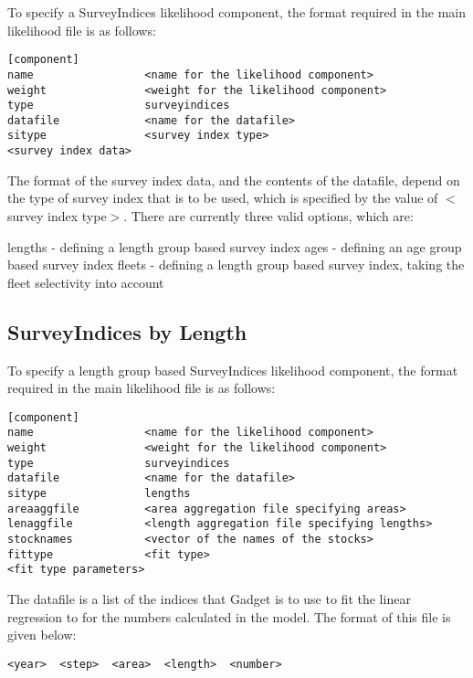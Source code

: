 \documentclass[10pt,twoside]{book}
\begin{document}
\bigskip
To specify a SurveyIndices likelihood component, the format required in the main likelihood file is as follows:

{\small\begin{verbatim}
[component]
name                 <name for the likelihood component>
weight               <weight for the likelihood component>
type                 surveyindices
datafile             <name for the datafile>
sitype               <survey index type>
<survey index data>
\end{verbatim}}

The format of the survey index data, and the contents of the datafile, depend on the type of survey index that is to be used, which is specified by the value of $<$survey index type$>$.  There are currently three valid options, which are:

\bigskip
lengths - defining a length group based survey index\newline
ages - defining an age group based survey index\newline
fleets - defining a length group based survey index, taking the fleet selectivity into account

\subsection{SurveyIndices by Length}\label{subsec:sibylength}
To specify a length group based SurveyIndices likelihood component, the format required in the main likelihood file is as follows:

{\small\begin{verbatim}
[component]
name                 <name for the likelihood component>
weight               <weight for the likelihood component>
type                 surveyindices
datafile             <name for the datafile>
sitype               lengths
areaaggfile          <area aggregation file specifying areas>
lenaggfile           <length aggregation file specifying lengths>
stocknames           <vector of the names of the stocks>
fittype              <fit type>
<fit type parameters>
\end{verbatim}}

The datafile is a list of the indices that Gadget is to use to fit the linear regression to for the numbers calculated in the model.  The format of this file is given below:

{\small\begin{verbatim}
<year>  <step>  <area>  <length>  <number>
\end{verbatim}}
\end{document}
